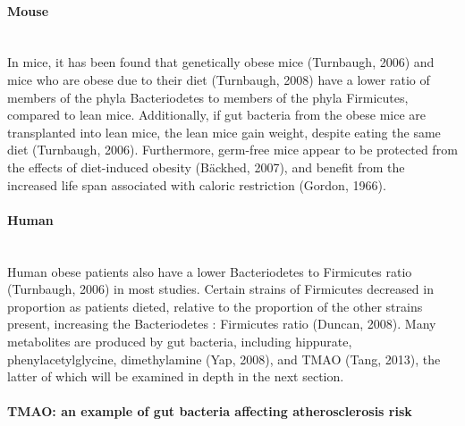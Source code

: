 \paragraph{Mouse}\mbox{}\\
In mice, it has been found that genetically obese mice (Turnbaugh, 2006) and mice who are obese due to their diet (Turnbaugh, 2008) have a lower ratio of members of the phyla Bacteriodetes to members of the phyla Firmicutes, compared to lean mice. Additionally, if gut bacteria from the obese mice are transplanted into lean mice, the lean mice gain weight, despite eating the same diet (Turnbaugh, 2006). Furthermore, germ-free mice appear to be protected from the effects of diet-induced obesity (Bäckhed, 2007), and benefit from the increased life span associated with caloric restriction (Gordon, 1966).

\paragraph{Human}\mbox{}\\
Human obese patients also have a lower Bacteriodetes to Firmicutes ratio (Turnbaugh, 2006) in most studies. Certain strains of Firmicutes decreased in proportion as patients dieted, relative to the proportion of the other strains present, increasing the Bacteriodetes : Firmicutes ratio (Duncan, 2008). Many metabolites are produced by gut bacteria, including hippurate, phenylacetylglycine, dimethylamine (Yap, 2008), and TMAO (Tang, 2013), the latter of which will be examined in depth in the next section.

\paragraph{TMAO: an example of gut bacteria affecting atherosclerosis risk}\mbox{}\\

